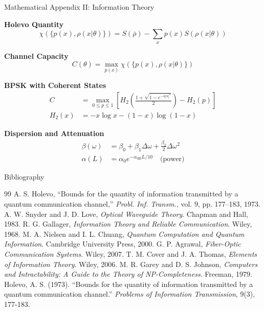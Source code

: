 \documentclass[10pt]{beamer}
\begin{document}
\begin{frame}{Mathematical Appendix II: Information Theory}
\footnotesize

\textbf{Holevo Quantity}
\begin{equation*}
\chi(\{p(x), \rho(x|\theta)\}) = S(\bar{\rho}) - \sum_x p(x)S(\rho(x|\theta))
\end{equation*}

\textbf{Channel Capacity}
\begin{equation*}
C(\theta) = \max_{p(x)} \chi(\{p(x), \rho(x|\theta)\})
\end{equation*}

\textbf{BPSK with Coherent States}
\begin{align*}
C &= \max_{0 \leq p \leq 1} \left[ H_2\left(\frac{1 + \sqrt{1 - e^{-4|\alpha|^2}}}{2}\right) - H_2(p) \right] \\
H_2(x) &= -x\log x - (1-x)\log(1-x)
\end{align*}

\textbf{Dispersion and Attenuation}
\begin{align*}
\beta(\omega) &= \beta_0 + \beta_1\Delta\omega + \frac{\beta_2}{2}\Delta\omega^2 \\
\alpha(L) &= \alpha_0 e^{-\alpha_{\text{dB}}L/10} \quad \text{(power)}
\end{align*}

\end{frame}


\begin{frame}{Bibliography}
\begin{thebibliography}{99}
 A. S. Holevo, ``Bounds for the quantity of information transmitted by a quantum communication channel,'' \textit{Probl. Inf. Transm.}, vol. 9, pp. 177–183, 1973.
 A. W. Snyder and J. D. Love, \textit{Optical Waveguide Theory}. Chapman and Hall, 1983.
 R. G. Gallager, \textit{Information Theory and Reliable Communication}. Wiley, 1968.
 M. A. Nielsen and I. L. Chuang, \textit{Quantum Computation and Quantum Information}. Cambridge University Press, 2000.
 G. P. Agrawal, \textit{Fiber-Optic Communication Systems}. Wiley, 2007.
 T. M. Cover and J. A. Thomas, \textit{Elements of Information Theory}. Wiley, 2006.
 M. R. Garey and D. S. Johnson, \textit{Computers and Intractability: A Guide to the Theory of NP-Completeness}. Freeman, 1979.
\bibitem{} Holevo, A. S. (1973). ``Bounds for the quantity of information transmitted by a quantum communication channel.'' \textit{Problems of Information Transmission}, 9(3), 177-183.
\end{thebibliography}
\end{frame}
\end{document}
